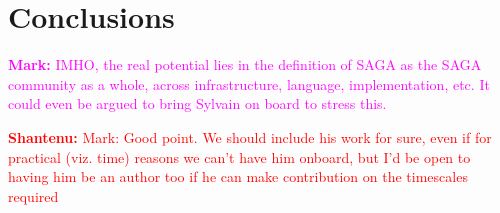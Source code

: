 \documentclass{article}
\newcommand{\B}[1]{\textbf{#1}}
\newcommand{\todo}[1]{{\textcolor{red}{\B{TODO:} #1 }}}
\newcommand{\jhanote}[1]{{\textcolor{red}{     \B{Shantenu:} #1 }}}
\newcommand{\msnote}[1]{{\textcolor{magenta}{ \B{Mark:    } #1 }}}
\newcommand{\todo}[1]{}
\newcommand{\jhanote}[1]{}
\newcommand{\msnote}[1]{}
\begin{document}
\section{Conclusions}
\label{sec:conclusions}

 \msnote{IMHO, the real potential lies in the definition of SAGA as the SAGA
 community as a whole, across infrastructure, language, implementation, etc.  It
 could even be argued to bring Sylvain on board to stress this.}

 \jhanote{Mark: Good point. We should include his work for sure, even if for
 practical (viz. time) reasons we can't have him onboard, but I'd be open to
 having him be an author too if he can make contribution on the timescales
 required}


% 
% 
% 
% 
% 
% 
% 
%  
\end{document}
